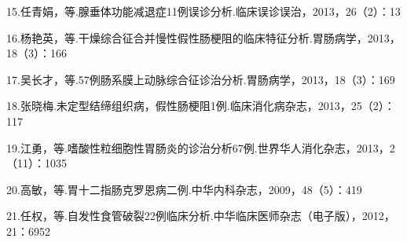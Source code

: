15.任青娟，等.腺垂体功能减退症11例误诊分析.临床误诊误治，2013，26（2）：13

16.杨艳英，等.干燥综合征合并慢性假性肠梗阻的临床特征分析.胃肠病学，2013，18（3）：166

17.吴长才，等.57例肠系膜上动脉综合征诊治分析.胃肠病学，2013，18（3）：169

18.张晓梅.未定型结缔组织病，假性肠梗阻1例.临床消化病杂志，2013，25（2）：117

19.江勇，等.嗜酸性粒细胞性胃肠炎的诊治分析67例.世界华人消化杂志，2013，2（11）：1035

20.高敏，等.胃十二指肠克罗恩病二例.中华内科杂志，2009，48（5）：419

21.任权，等.自发性食管破裂22例临床分析.中华临床医师杂志（电子版），2012，21：6952

\protect\hypertarget{text00166.html}{}{}

